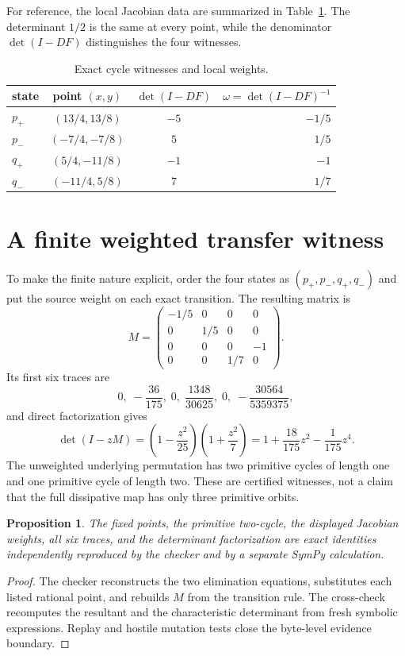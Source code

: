 \documentclass[10pt]{article}
\newtheorem{proposition}{Proposition}
\begin{document}
For reference, the local Jacobian data are summarized in
Table~\ref{tab:cycles}.  The determinant $1/2$ is the same at every point,
while the denominator $\det(I-DF)$ distinguishes the four witnesses.
\begin{table}[ht]
\centering
\small
\caption{Exact cycle witnesses and local weights.}
\label{tab:cycles}
\begin{tabular}{@{}lccr@{}}
\toprule
state & point \((x,y)\) & \(\det(I-DF)\) & \(\omega=\det(I-DF)^{-1}\)\\
\midrule
\(p_+\) & \((13/4,13/8)\) & \(-5\) & \(-1/5\)\\
\(p_-\) & \((-7/4,-7/8)\) & \(5\) & \(1/5\)\\
\(q_+\) & \((5/4,-11/8)\) & \(-1\) & \(-1\)\\
\(q_-\) & \((-11/4,5/8)\) & \(7\) & \(1/7\)\\
\bottomrule
\end{tabular}
\end{table}

\section{A finite weighted transfer witness}
To make the finite nature explicit, order the four states as
$(p_+,p_-,q_+,q_-)$ and put the source weight on each exact transition.
The resulting matrix is
\[
 M=\begin{pmatrix}
 -1/5&0&0&0\\
 0&1/5&0&0\\
 0&0&0&-1\\
 0&0&1/7&0
 \end{pmatrix}.
\]
Its first six traces are
\[
 0,\; -\frac{36}{175},\;0,\;\frac{1348}{30625},\;0,
 \;-\frac{30564}{5359375},
\]
and direct factorization gives
\[
 \det(I-zM)=\left(1-\frac{z^2}{25}\right)
 \left(1+\frac{z^2}{7}\right)
 =1+\frac{18}{175}z^2-\frac1{175}z^4.
\]
The unweighted underlying permutation has two primitive cycles of length one
and one primitive cycle of length two.  These are certified witnesses, not a
claim that the full dissipative map has only three primitive orbits.

\begin{proposition}
The fixed points, the primitive two-cycle, the displayed Jacobian weights,
all six traces, and the determinant factorization are exact identities
independently reproduced by the checker and by a separate SymPy calculation.
\end{proposition}
\begin{proof}
The checker reconstructs the two elimination equations, substitutes each
listed rational point, and rebuilds $M$ from the transition rule.  The
cross-check recomputes the resultant and the characteristic determinant from
fresh symbolic expressions.  Replay and hostile mutation tests close the
byte-level evidence boundary.
\end{proof}
\end{document}
